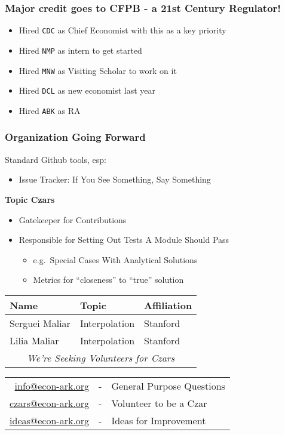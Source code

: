 \documentclass[public]{beamer}
\providecommand{\CDC}{\texttt{CDC}} %
\providecommand{\NMP}{\texttt{NMP}} %
\providecommand{\MNW}{\texttt{MNW}} %
\providecommand{\DCL}{\texttt{DCL}} %
\providecommand{\ABK}{\texttt{ABK}} %
\begin{document}
\begin{frame}
\frametitle{Major credit goes to CFPB - a 21st Century Regulator!}

\begin{itemize}
\item Hired {\CDC} as Chief Economist with this as a key priority
\item Hired {\NMP} as intern to get started
\item Hired {\MNW} as Visiting Scholar to work on it
\item Hired {\DCL} as new economist last year
\item Hired {\ABK} as RA
\end{itemize}
\end{frame}


\begin{frame}
\frametitle{Organization Going Forward}

Standard Github tools, esp:
\begin{itemize}
\item Issue Tracker: If You See Something, Say Something
\end{itemize}
\begin{center}
{\bf Topic Czars}

\begin{itemize}
\item Gatekeeper for Contributions
\item Responsible for Setting Out Tests A Module Should Pass
\begin{itemize}
\item e.g.\ Special Cases With Analytical Solutions
\item Metrics for ``closeness'' to ``true'' solution
\end{itemize}
\end{itemize}

\pause 
\begin{tabular}{lll}
Name & Topic & Affiliation
\\ \hline  Serguei Maliar & Interpolation & Stanford %
\\ Lilia Maliar & Interpolation & Stanford %
\\  \multicolumn{3}{c}{{\it We're Seeking Volunteers for Czars}}
\end{tabular}
\end{center}

\pause
\begin{tabular}{rcl}
\hline \href{mailto:info@econ-ark.org}{info@econ-ark.org} & - & General Purpose Questions
\\ \href{mailto:czars@econ-ark.org}{czars@econ-ark.org} & - & Volunteer to be a Czar
\\ \href{mailto:ideas@econ-ark.org}{ideas@econ-ark.org} & - & Ideas for Improvement
\end{tabular}


\end{frame}
\end{document}

